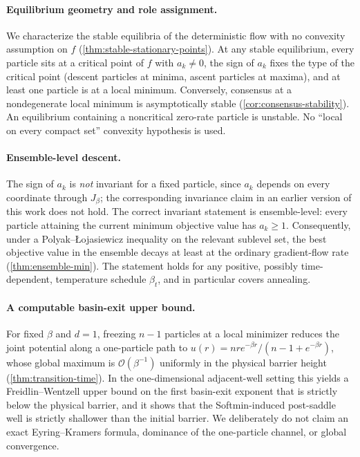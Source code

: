 \documentclass{article}
\theoremstyle{plain}
\theoremstyle{definition}
\theoremstyle{remark}
\begin{document}
\paragraph{Equilibrium geometry and role assignment.}
We characterize the stable equilibria of the deterministic flow with no convexity assumption on \(f\) (\ref{thm:stable-stationary-points}). At any stable equilibrium, every particle sits at a critical point of \(f\) with \(a_k\ne0\), the sign of \(a_k\) fixes the type of the critical point (descent particles at minima, ascent particles at maxima), and at least one particle is at a local minimum. Conversely, consensus at a nondegenerate local minimum is asymptotically stable (\ref{cor:consensus-stability}). An equilibrium containing a noncritical zero-rate particle is unstable. No ``local on every compact set'' convexity hypothesis is used.

\paragraph{Ensemble-level descent.}
The sign of \(a_k\) is \emph{not} invariant for a fixed particle, since \(a_k\) depends on every coordinate through \(J_\beta\); the corresponding invariance claim in an earlier version of this work does not hold. The correct invariant statement is ensemble-level: every particle attaining the current minimum objective value has \(a_k\ge1\). Consequently, under a Polyak--\L{}ojasiewicz inequality on the relevant sublevel set, the best objective value in the ensemble decays at least at the ordinary gradient-flow rate (\ref{thm:ensemble-min}). The statement holds for any positive, possibly time-dependent, temperature schedule \(\beta_t\), and in particular covers annealing.

\paragraph{A computable basin-exit upper bound.}
For fixed \(\beta\) and \(d=1\), freezing \(n-1\) particles at a local minimizer reduces the joint potential along a one-particle path to \(u(r)=nre^{-\beta r}/(n-1+e^{-\beta r})\), whose global maximum is \(\mathcal O(\beta^{-1})\) uniformly in the physical barrier height (\ref{thm:transition-time}). In the one-dimensional adjacent-well setting this yields a Freidlin--Wentzell upper bound on the first basin-exit exponent that is strictly below the physical barrier, and it shows that the Softmin-induced post-saddle well is strictly shallower than the initial barrier. We deliberately do not claim an exact Eyring--Kramers formula, dominance of the one-particle channel, or global convergence.
\end{document}
